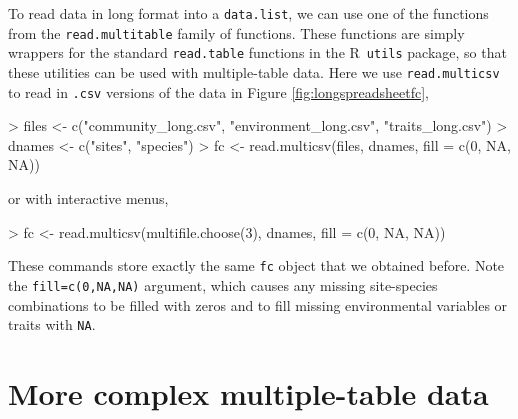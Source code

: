 \documentclass{article}
\newcommand{\R}{{\sf R}}
\newcommand{\code}[1]{\texttt{#1}}
\numberwithin{exercise}{section}
\begin{document}
To read data in long format into a \code{data.list}, we can use one of the functions from the \code{read.multitable} family of functions.  These functions are simply wrappers for the standard \code{read.table} functions in the \R\ \code{utils} package, so that these utilities can be used with multiple-table data.  Here we use \code{read.multicsv} to read in \code{.csv} versions of the data in Figure \ref{fig:longspreadsheetfc},
\begin{Schunk}
\begin{Sinput}
> files <- c("community_long.csv", "environment_long.csv", "traits_long.csv")
> dnames <- c("sites", "species")
> fc <- read.multicsv(files, dnames, fill = c(0, NA, NA))
\end{Sinput}
\end{Schunk}
or with interactive menus,
\begin{Schunk}
\begin{Sinput}
> fc <- read.multicsv(multifile.choose(3), dnames, fill = c(0, NA, NA))
\end{Sinput}
\end{Schunk}
These commands store exactly the same \code{fc} object that we obtained before.  Note the \code{fill=c(0,NA,NA)} argument, which causes any missing site-species combinations to be filled with zeros and to fill missing environmental variables or traits with \code{NA}.

\section{More complex multiple-table data}
\end{document}
